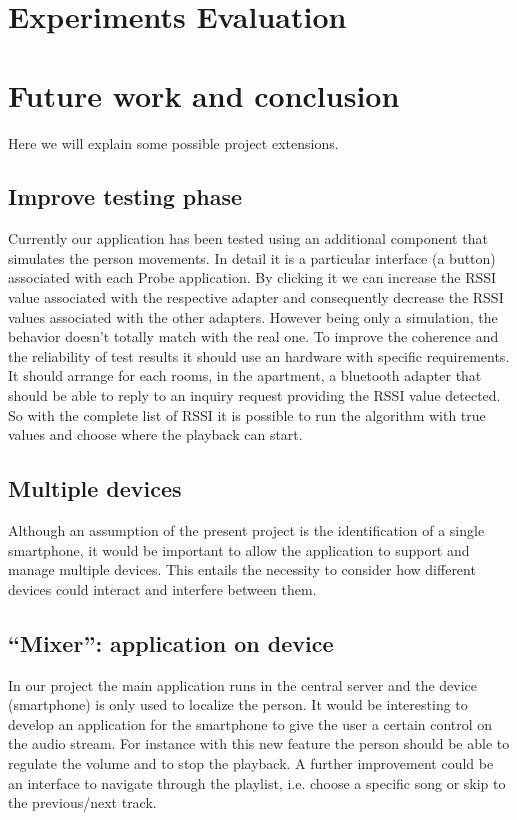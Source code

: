 \documentclass[conference]{./IEEEtran}
\begin{document}
\section{Experiments Evaluation}

\section{Future work and conclusion}
Here we will explain some possible project extensions. 
\subsection{Improve testing phase}
Currently our application has been tested using an additional component that simulates the person movements. In detail it is a particular interface (a button) associated with each Probe application. By clicking it we can increase the RSSI value associated with the respective adapter and consequently decrease the RSSI values associated with the other adapters. However being only a simulation, the behavior doesn't totally match  with the real one. To improve the coherence and the reliability of test results it should use an hardware with specific requirements. It should arrange for each rooms, in the apartment, a bluetooth adapter that should be able to reply to an inquiry request providing the RSSI value detected. So with the complete list of RSSI it is possible to run the algorithm with true values and choose where the playback can start.   
\subsection{Multiple devices}
Although an assumption of the present project is the identification of a single smartphone, it would be important to allow the application to support and manage multiple devices. This entails the necessity to consider how different devices could interact and interfere between them.       
\subsection{``Mixer'': application on device}
In our project the main application runs in the central server and the device (smartphone) is only used to localize the person. It would be interesting to develop an application for the smartphone to give the user a certain control on the audio stream. For instance with this new feature the person should be able to regulate the volume and to stop the playback. A further improvement could be an interface to navigate through the playlist, i.e. choose a specific song or skip to the previous/next track.  
\end{document}
